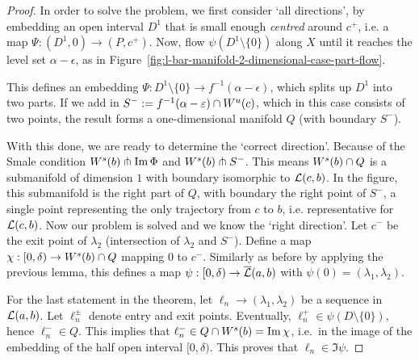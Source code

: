 \begin{proof}
    In order to solve the problem, we first consider `all directions', by embedding an open interval $D^{1}$ that is small enough \emph{centred} around $c^{+}$, i.e. a map $\Psi: (D^{1}, 0) \to  (P, c^{+})$.
    Now, flow $\psi(D^{1} \setminus \{0\} )$ along $X$ until it reaches the level set $\alpha - \epsilon$, as in Figure~\ref{fig:l-bar-manifold-2-dimensional-case-part-flow}.
    \begin{marginfigure}
        \centering
        \caption{An overview of the different submanifolds considered in the proof.}
        \label{fig:l-bar-manifold-2-dimensional-case-part-flow}
    \end{marginfigure}
    This defines an embedding $\Psi: D^{1} \setminus \{0\} \to  f^{-1}(\alpha-\epsilon)$, which splits up $D^{1}$ into two parts.
    If we add in $S^{-} := f^{-1}(\alpha-\varepsilon) \cap W^u(c)$, which in this case consists of two points, the result forms a one-dimensional manifold $Q$ (with boundary $S^{-}$).

    With this done, we are ready to determine the `correct direction'.
    Because of the Smale condition $W^s(b) \pitchfork \operatorname{Im} \Phi$ and  $W^s(b) \pitchfork S^{-}$.
    This means $W^s(b) \cap Q$ is a submanifold of dimension $1$ with boundary isomorphic to $\mathcal L(c, b)$.
    In the figure, this submanifold is the right part of $Q$, with boundary the right point of $S^{-}$, a single point representing the only trajectory from $c$ to $b$, i.e. representative for $\mathcal L(c, b)$.
    Now our problem is solved and we know the `right direction'.
    Let $c^{-}$ be the exit point of $\lambda_2$ (intersection of $\lambda_2$ and $S^{-}$). 
    Define a map $\chi:[0, \delta) \to  W^s(b) \cap  Q$ mapping $0$ to  $c^{-}$.
    Similarly as before by applying the previous lemma, this defines a map $\psi: [0, \delta) \to  \overline{\mathcal L}(a, b)$ with $\psi(0) = (\lambda_1, \lambda_2)$.

    For the last statement in the theorem, let $\ell_n \to  (\lambda_1, \lambda_2)$ be a sequence in $\mathcal L(a, b)$. Let $ \ell^{\pm}_n$ denote entry and exit points. 
    Eventually, $\ell_n^{+} \in \psi(D \setminus \{0\})$, hence $ \ell_n^{-} \in Q$. This implies that $ \ell_n^{-} \in Q \cap W^s(b) = \operatorname{Im} \chi$, i.e.\ in the image of the embedding of the half open interval $[0, \delta)$.
    This proves that $ \ell_n \in \Im \psi$.


\end{proof}
